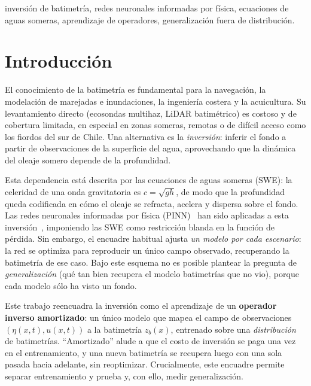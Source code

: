 \documentclass[conference]{IEEEtran}
\newcommand{\zb}{z_b}
\begin{document}
\begin{IEEEkeywords}
inversión de batimetría, redes neuronales informadas por física, ecuaciones de
aguas someras, aprendizaje de operadores, generalización fuera de distribución.
\end{IEEEkeywords}

\section{Introducción}
\label{sec:intro}

El conocimiento de la batimetría es fundamental para la navegación, la
modelación de marejadas e inundaciones, la ingeniería costera y la acuicultura.
Su levantamiento directo (ecosondas multihaz, LiDAR batimétrico) es costoso y
de cobertura limitada, en especial en zonas someras, remotas o de difícil
acceso como los fiordos del sur de Chile. Una alternativa es la
\emph{inversión}: inferir el fondo a partir de observaciones de la superficie
del agua, aprovechando que la dinámica del oleaje somero depende de la
profundidad.

Esta dependencia está descrita por las ecuaciones de aguas someras (SWE): la
celeridad de una onda gravitatoria es $c=\sqrt{gh}$, de modo que la profundidad
queda codificada en cómo el oleaje se refracta, acelera y dispersa sobre el
fondo. Las redes neuronales informadas por física (PINN)~\cite{raissi2019} han
sido aplicadas a esta inversión~\cite{dazzi2024,tian2025,ohara2024}, imponiendo
las SWE como restricción blanda en la función de pérdida. Sin embargo, el
encuadre habitual ajusta \emph{un modelo por cada escenario}: la red se optimiza
para reproducir un único campo observado, recuperando la batimetría de ese caso.
Bajo este esquema no es posible plantear la pregunta de \emph{generalización}
(qué tan bien recupera el modelo batimetrías que no vio), porque cada modelo
sólo ha visto un fondo.

Este trabajo reencuadra la inversión como el aprendizaje de un \textbf{operador
inverso amortizado}: un único modelo que mapea el campo de observaciones
$(\eta(x,t), u(x,t))$ a la batimetría $\zb(x)$, entrenado sobre una
\emph{distribución} de batimetrías. ``Amortizado'' alude a que el costo de
inversión se paga una vez en el entrenamiento, y una nueva batimetría se recupera
luego con una sola pasada hacia adelante, sin reoptimizar. Crucialmente, este
encuadre permite separar entrenamiento y prueba y, con ello, medir generalización.
\end{document}
